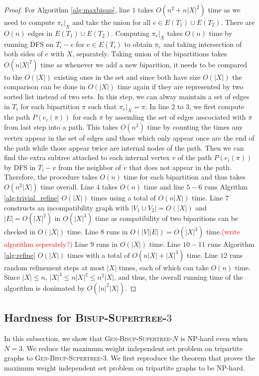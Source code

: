 \documentclass{bmcart}
\newcommand{\note}[1]{\textcolor{red}{#1}}
\newcommand{\genbisup}{\textsc{Gen-Bisup-Supertree-$N$}\xspace}
\newcommand{\genbisupthree}{\textsc{Gen-Bisup-Supertree-$3$}\xspace}
\begin{document}
\begin{proof}
For Algorithm \ref{alg:maxbisup}, line $1$ takes $O(n^2+ n|X|^2)$ time as we need to compute $\pi_e|_X$ and take the union for all $e \in E(T_1) \cup E(T_2)$. There are $O(n)$ edges in $E(T_1) \cup E(T_2)$. Computing $\pi_e|_X$ takes $O(n)$ time by running DFS on $T_i - e$ for $e \in E(T_i)$ to obtain $\pi_e$ and taking intersection of both sides of $e$ with $X$, separately. Taking union of the bipartitions takes $O(n |X|^2)$ time as whenever we add a new biparition, it needs to be compared to the $O(|X|)$ existing ones in the set and since both have size $O(|X|)$ the comparison can be done in $O(|X|)$ time again if they are represented by two sorted list instead of two sets. In this step, we can alway maintain a set of edges in $T_i$ for each bipartition $\pi$ such that $\pi_e|_X = \pi$. In line $2$ to $3$, we first compute the path $P(e_i(\pi))$ for each $\pi$ by assemling the set of edges asscociated with $\pi$ from last step into a path. This takes $O(n^2)$ time by counting the times any vertex appear in the set of edges and those which only appear once are the end of the path while those appear twice are internal nodes of the path. Then we can find the extra subtree attached to each internal vertex $v$ of the path $P(e_i(\pi))$ by DFS in $T_i - v$ from the neighbor of $v$ that does not appear in the path. Therefore, the procedure takes $O(n)$ time for each bipartition and thus takes $O(n^2|X|)$ time overall. Line $4$ takes $O(n)$ time and line $5-6$ runs Algrithm \ref{alg:trivial_refine} $O(|X|)$ times using a total of $O(n|X|)$ time. Line $7$ constructs an incompatibility graph with $|V_1\cup V_2| = O(|X|)$ and $|E| = O(|X|^2)$ in $O(|X|^3)$ time as compatibility of two biparitions can be checked in $O(|X|)$ time. Line $8$ runs in $O(|V||E|) = O(|X|^3)$ time.\note{(write algorithm seperately?)} Line $9$ runs in $O(|X|)$ time. Line $10-11$ runs Algorithm \ref{alg:refine} $O(|X|)$ times with a total of $O(n|X|+|X|^3)$ time. Line $12$ runs random refinement steps at most $|X|$ times, each of which can take $O(n)$ time. Since $|X| \le n$, $|X|^3 \le n|X|^2 \le n^2|X|$, and thus, the overall running time of the algorithm is donimated by $O(|n|^2|X|)$.
\end{proof}

\subsection{Hardness for \textsc{Bisup-Supertree-$3$}}
In this subsection, we show that \genbisup is NP-hard even when $N = 3$. We reduce the maximum weight independent set problem on tripartite graphs to \genbisupthree. We first reproduce the theorem that proves the maximum weight independent set problem on tripartite graphs to be NP-hard.
\end{document}
